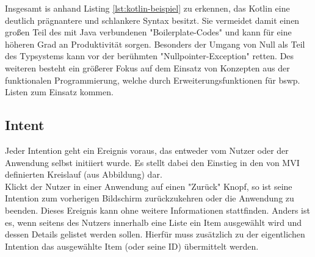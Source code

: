 \bigskip
Insgesamt is anhand Listing
\ref{lst:kotlin-beispiel}
zu erkennen, das Kotlin eine deutlich prägnantere und schlankere Syntax besitzt. Sie vermeidet damit einen großen Teil des mit Java verbundenen "Boilerplate-Codes" und kann für eine höheren Grad an Produktivität sorgen. Besonders der Umgang von Null als Teil des Typsystems kann vor der berühmten "Nullpointer-Exception" retten. Des weiteren besteht ein größerer Fokus auf dem Einsatz von Konzepten aus der funktionalen Programmierung, welche durch Erweiterungsfunktionen für bswp. Listen zum Einsatz kommen.

\subsection{Intent}
Jeder Intention geht ein Ereignis voraus, das entweder vom Nutzer oder der Anwendung selbst initiiert wurde. Es stellt dabei den Einstieg in den von MVI definierten Kreislauf (aus Abbildung) dar. 
\\
Klickt der Nutzer in einer Anwendung auf einen "Zurück" Knopf, so ist seine Intention zum vorherigen Bildschirm zurückzukehren oder die Anwendung zu beenden. Dieses Ereignis kann ohne weitere Informationen stattfinden. Anders ist es, wenn seitens des Nutzers innerhalb eine Liste ein Item ausgewählt wird und dessen Details gelistet werden sollen. Hierfür muss zusätzlich zu der eigentlichen Intention das ausgewählte Item (oder seine ID) übermittelt werden. 
 
